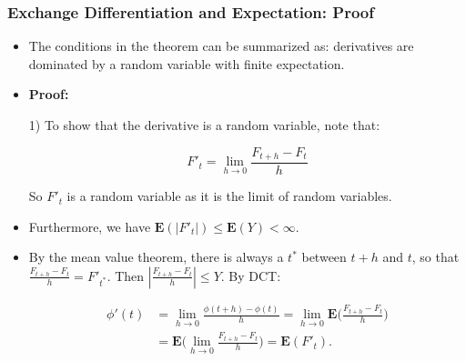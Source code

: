 \documentclass[handout]{beamer}
\newcommand{\BE}{\mathbf{E}}
\begin{document}
\frame
{
  \frametitle{Exchange Differentiation and Expectation: Proof} 

   \begin{itemize}
   
  
                \item<1-> The conditions in the theorem can be summarized as:  derivatives are dominated by a random variable with finite expectation. 

               \item<2-> \textbf{Proof:} 
                
                1) To show that the derivative is a random variable, note that:
                
                $$F'_t=\lim_{h\rightarrow 0} \frac{F_{t+h}-F_t}{h}$$
                
                So $F'_t$ is a random variable as it is the limit of random variables. 
               
               \item<3->[-]  Furthermore, we have $\BE(|F'_t|)\leq \BE(Y)<\infty$.  
                
                  \item<4->[-] By the mean value theorem, there is always a $t^*$ between $t+h$ and $t$, so that $\frac{F_{t+h}-F_t}{h}=F'_{t^*}$. Then $|\frac{F_{t+h}-F_t}{h}|\leq Y$. By DCT: 
                  
                  
                                  \begin{align*} \phi'(t)& =\lim_{h\rightarrow 0} \frac{\phi(t+h)-\phi(t) }{h}=\lim_{h\rightarrow 0} \BE \big (  \frac{F_{t+h}-F_t}{h} \big ) \\ 
                                  &=\BE \big (\lim_{h\rightarrow 0}   \frac{F_{t+h}-F_t}{h} \big )=\BE(F'_t). \end{align*}
                                  
                                                                      \end{itemize}
}
\end{document}
